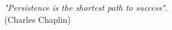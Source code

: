 
\chapter*{}
\vspace{15cm}
\begin{flushright}
	\textit
	{
		"Persistence is the shortest path to success".
	}\medskip\\ 
	(Charles Chaplin)
\end{flushright}